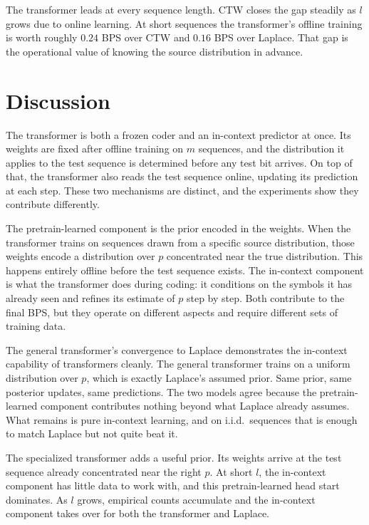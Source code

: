 \documentclass[onecolumn,english,12pt]{IEEEtran}
\theoremstyle{plain}
\theoremstyle{plain}
\theoremstyle{plain}
\theoremstyle{definition}
\begin{document}
The transformer leads at every sequence length. CTW closes the gap steadily
as $l$ grows due to online learning. At
short sequences the transformer's offline training is worth roughly $0.24$
BPS over CTW and $0.16$ BPS over Laplace. That gap is the operational value
of knowing the source distribution in advance.

\section{Discussion}
\label{sec:discussion}

The transformer is both a frozen coder and an in-context predictor at once. Its weights are fixed after offline training on $m$ sequences, and the distribution it applies to the test sequence is determined before any test bit arrives. On top of that, the transformer also reads the test sequence online, updating its prediction at each step. These two mechanisms are distinct, and the experiments show they contribute differently.

The pretrain-learned component is the prior encoded in the weights. When the transformer trains on sequences drawn from a specific source distribution, those weights encode a distribution over $p$ concentrated near the true distribution. This happens entirely offline before the test sequence exists. The in-context component is what the transformer does during coding: it conditions on the symbols it has already seen and refines its estimate of $p$ step by step. Both contribute to the final BPS, but they operate on different aspects and require different sets of training data.

The general transformer's convergence to Laplace demonstrates the in-context capability of transformers cleanly. The general transformer trains on a uniform distribution over $p$, which is exactly Laplace's assumed prior. Same prior, same posterior updates, same predictions. The two models agree because the pretrain-learned component contributes nothing beyond what Laplace already assumes. What remains is pure in-context learning, and on i.i.d.\ sequences that is enough to match Laplace but not quite beat it.

The specialized transformer adds a useful prior. Its weights arrive at the test sequence already concentrated near the right $p$. At short $l$, the in-context component has little data to work with, and this pretrain-learned head start dominates. As $l$ grows, empirical counts accumulate and the in-context component takes over for both the transformer and Laplace.
\end{document}
